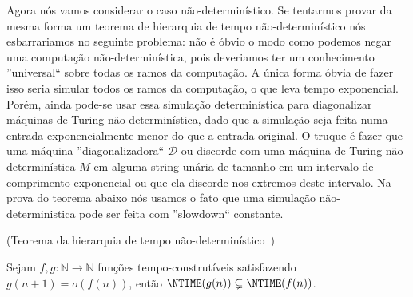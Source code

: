 Agora nós vamos considerar o caso não-determinístico. Se tentarmos provar da mesma forma um teorema de hierarquia de tempo não-determinístico nós esbarrariamos no seguinte problema: não é óbvio o modo como podemos negar uma computação não-determinística, pois deveriamos ter um conhecimento ''universal`` sobre todas os ramos da computação. A única forma óbvia de fazer isso seria simular todos os ramos da computação, o que leva tempo exponencial. Porém, ainda pode-se usar essa simulação determinística para diagonalizar máquinas de Turing não-determinística, dado que a simulação seja feita numa entrada exponencialmente menor do que a entrada original. O truque é fazer que uma máquina ''diagonalizadora`` $\mathcal{D}$ ou discorde com uma máquina de Turing não-determinística $M$ em alguma string unária de tamanho em um intervalo de comprimento exponencial ou que ela discorde nos extremos deste intervalo. Na prova do teorema abaixo nós usamos o fato que uma simulação não-deterministica pode ser feita com ''slowdown`` constante.

\begin{teo} (Teorema da hierarquia de tempo não-determinístico~\cite{cook1973hierarchy})

Sejam $f, g: \mathbb{N} \to \mathbb{N}$ funções tempo-construtíveis satisfazendo $g(n + 1) = o(f(n))$, então $\NTIME(g(n)) \subsetneq \NTIME(f(n))$.

\end{teo}

